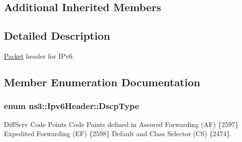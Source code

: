 \subsection*{Additional Inherited Members}


\subsection{Detailed Description}
\hyperlink{classns3_1_1Packet}{Packet} header for I\+Pv6. 

\subsection{Member Enumeration Documentation}
\subsubsection[{\texorpdfstring{Dscp\+Type}{DscpType}}]{\setlength{\rightskip}{0pt plus 5cm}enum {\bf ns3\+::\+Ipv6\+Header\+::\+Dscp\+Type}}\hypertarget{classns3_1_1Ipv6Header_afdc89ed9acd990a7613782323e4c95ee}{}\label{classns3_1_1Ipv6Header_afdc89ed9acd990a7613782323e4c95ee}


Diff\+Serv Code Points Code Points defined in Assured Forwarding (AF) \{2597\} Expedited Forwarding (EF) \{2598\} Default and Class Selector (CS) \{2474\}. 

